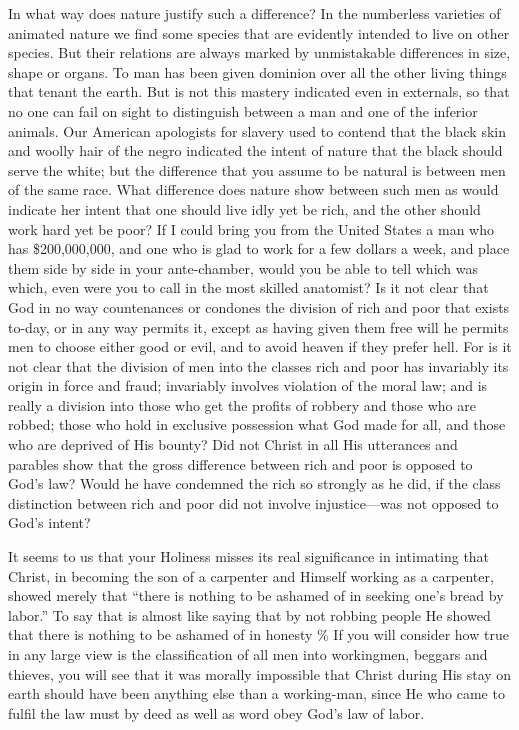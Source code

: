 \documentclass{book}
\begin{document}
In what way does nature justify such a difference? In the numberless varieties of animated nature we find some species that are evidently intended to live on other species. But their relations are always marked by unmistakable differences in size, shape or organs. To man has been given dominion over all the other living things that tenant the earth. But is not this mastery indicated even in externals, so that no one can fail on sight to distinguish between a man and one of the inferior animals. Our American apologists for slavery used to contend that the black skin and woolly hair of the negro indicated the intent of nature that the black should serve the white; but the difference that you assume to be natural is between men of the same race. What difference does nature show between such men as would indicate her intent that one should live idly yet be rich, and the other should work hard yet be poor? If I could bring you from the United States a man who has \$200,000,000, and one who is glad to work for a few dollars a week, and place them side by side in your ante-chamber, would you be able to tell which was which, even were you to call in the most skilled anatomist? Is it not clear that God in no way countenances or condones the division of rich and poor that exists to-day, or in any way permits it, except as having given them free will he permits men to choose either good or evil, and to avoid heaven if they prefer hell. For is it not clear that the division of men into the classes rich and poor has invariably its origin in force and fraud; invariably involves violation of the moral law; and is really a division into those who get the profits of robbery and those who are robbed; those who hold in exclusive possession what God made for all, and those who are deprived of His bounty? Did not Christ in all His utterances and parables show that the gross difference between rich and poor is opposed to God’s law? Would he have condemned the rich so strongly as he did, if the class distinction between rich and poor did not involve injustice—was not opposed to God’s intent?

It seems to us that your Holiness misses its real significance in intimating that Christ, in becoming the son of a carpenter and Himself working as a carpenter, showed merely that “there is nothing to be ashamed of in seeking one’s bread by labor.” To say that is almost like saying that by not robbing people He showed that there is nothing to be ashamed of in honesty \% If you will consider how true in any large view is the classification of all men into workingmen, beggars and thieves, you will see that it was morally impossible that Christ during His stay on earth should have been anything else than a working-man, since He who came to fulfil the law must by deed as well as word obey God’s law of labor.
\end{document}
